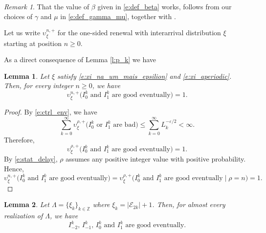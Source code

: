 \documentclass[a4paper,oneside,12pt]{amsart}
\renewcommand{\leq}{\leqslant}
\renewcommand{\geq}{\geqslant}
\theoremstyle{plain}
\newtheorem{lemma}{Lemma}
\theoremstyle{definition}
\theoremstyle{remark}
\newtheorem{remark}{Remark}
\begin{document}
\begin{remark} 
That the value of $\beta$ given in \eqref{e:def_beta} works, follows from our choices of $\gamma$ and $\mu$ in \eqref{e:def_gamma_mu}, together with \cite[Eq.\ (37), pp.\ 3156]{Hilario2023}.
\end{remark}

Let us write $\upsilon_{\xi}^{n,+}$ for the one-sided renewal with interarrival distribution $\xi$ starting at position $n \geq 0$.

As a direct consequence of Lemma \ref{l:p_k} we have
\begin{lemma}
Let $\xi$ satisfy \eqref{e:xi_na_um_mais_epsilion} and \eqref{e:xi_aperiodic}.
Then, for every integer $n\geq 0$, we have
\begin{equation}
\label{e:eventually_good_n}
\upsilon_{\xi}^{n,+} \big(\text{$I^k_{0}$ and $I^k_1$ are good eventually} \big) =1.
\end{equation}
\end{lemma}

\begin{proof}
By \eqref{e:ctrl_env}, we have 
\[
\sum_{k=0}^{\infty} \upsilon^{\rho,+}_{\xi} \big(\text{$I^k_0$ or $I^k_1$ are bad}\big) \leq \sum_{k=0}^{\infty} L_k^{-\varepsilon/2} < \infty.
\]
Therefore,
\[
\upsilon^{\rho,+}_{\xi} \big(\text{$I^k_0$ and $I^k_1$ are good eventually}\big) =1.
\]
By \eqref{e:stat_delay}, $\rho$ assumes any positive integer value with positive probability.
Hence,
\[
\upsilon^{n,+}_{\xi} \big(\text{$I^k_0$ and $I^k_1$ are good eventually}\big) =\upsilon^{\rho,+}_{\xi} \big(\text{$I^k_0$ and $I^k_1$ are good eventually} \mid \rho = n\big) = 1.
\]
\end{proof}

\begin{lemma}

Let $\Lambda = \big\{\xi_k\big\}_{k\in \mathbb{Z}}$ where $\xi_k=|\mathcal{E}_{2k}|+1$.
Then, for almost every realization of $\Lambda$, we have
\begin{equation}
\text{$I^k_{-2}$, $I^k_{-1}$, $I^k_{0}$ and $I^k_1$ are good eventually}.
\end{equation}
\end{lemma}
\end{document}
